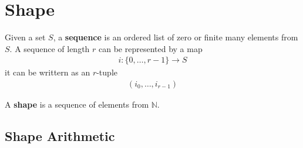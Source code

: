 \section{Shape}
Given a set $S$, a \textbf{sequence} is an ordered list of zero or finite many elements from $S$.
A sequence of length $r$ can be represented by a map
\begin{align*}
    i : \{0, \dots, r - 1\} \to S
\end{align*}
it can be writtern as an $r$-tuple
\begin{align*}
    (i_0, \dots, i_{r - 1})
\end{align*}

A \textbf{shape} is a sequence of elements from $\mathbb N$.

\subsection{Shape Arithmetic}
